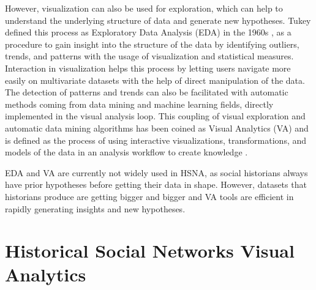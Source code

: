 However, visualization can also be used for exploration, which can help to understand the underlying structure of data and generate new hypotheses.
Tukey defined this process as Exploratory Data Analysis (EDA) in the 1960s \cite{tukeyExploratoryDataAnalysis1977}, as a procedure to gain insight into the structure of the data by identifying outliers, trends, and patterns with the usage of visualization and statistical measures.
Interaction in visualization helps this process by letting users navigate more easily on multivariate datasets with the help of direct manipulation of the data.
The detection of patterns and trends can also be facilitated with automatic methods coming from data mining and machine learning fields, directly implemented in the visual analysis loop.
This coupling of visual exploration and automatic data mining algorithms has been coined as Visual Analytics (VA) and is defined as the process of using interactive visualizations, transformations, and models of the data in an analysis workflow to create knowledge \cite{keimVisualAnalyticsDefinition2008}.

EDA and VA are currently not widely used in HSNA, as social historians always have prior hypotheses before getting their data in shape.
However, datasets that historians produce are getting bigger and bigger and VA tools are efficient in rapidly generating insights and new hypotheses.


\section{Historical Social Networks Visual Analytics}\label{sec:intro-HSNV}


